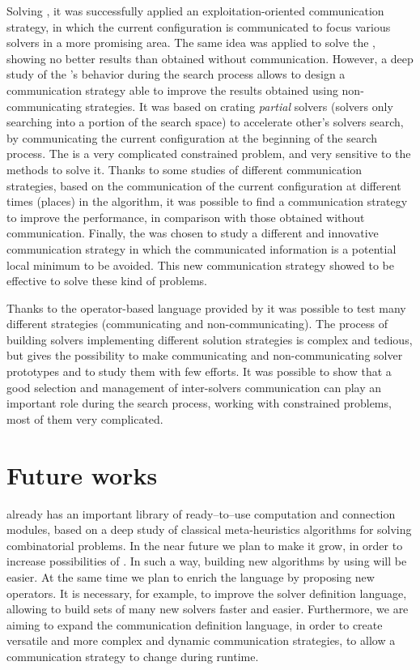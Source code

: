 Solving \sgp{}, it was successfully applied an exploitation-oriented communication strategy, in which the current configuration is communicated to focus various solvers in a more promising area. The same idea was applied to solve the \nqp{}, showing no better results than obtained without communication. However, a deep study of the \posl's behavior during the search process allows to design a communication strategy able to improve the results obtained using non-communicating strategies. It was based on crating \textit{partial} solvers (solvers only searching into a portion of the search space) to accelerate other's solvers search, by communicating the current configuration at the beginning of the search process. The \carrp{} is a very complicated constrained problem, and very sensitive to the methods to solve it. Thanks to some studies of different communication strategies, based on the communication of the current configuration at different times (places) in the algorithm, it was possible to find a communication strategy to improve the performance, in comparison with those obtained without communication. Finally, the \grp{} was chosen to study a different and innovative communication strategy in which the communicated information is a potential local minimum to be avoided. This new communication strategy showed to be effective to solve these kind of problems.

Thanks to the operator-based language provided by \posl{} it was possible to test many different strategies (communicating and non-communicating). The process of building solvers implementing different solution strategies is complex and tedious, but \posl{} gives the possibility to make communicating and non-communicating solver prototypes and to study them with few efforts. It was possible to show that a good selection and management of inter-solvers communication can play an important role during the search process, working with constrained problems, most of them very complicated.

\section{Future works} 

\posl{} already has an important library of ready--to--use computation and connection modules, based on a deep study of classical meta-heuristics algorithms for solving combinatorial problems. In the near future we plan to make it grow, in order to increase possibilities of \posl{}. In such a way, building new algorithms by using \posl{} will be easier.
At the same time we plan to enrich the language by proposing new operators. It is necessary, for example, to improve the solver definition language, allowing to build sets of many new solvers faster and easier. Furthermore, we are aiming to expand the communication definition language, in order to create versatile and more complex and dynamic communication strategies, to allow a communication strategy to change during runtime.

